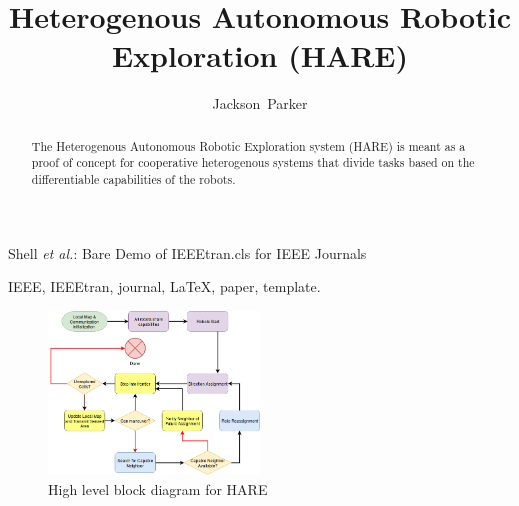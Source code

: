\documentclass[conference]{IEEEtran}
\begin{document}
\title{Heterogenous Autonomous Robotic Exploration (HARE)}

\author{Jackson~Parker}

%
{Shell \MakeLowercase{\textit{et al.}}: Bare Demo of IEEEtran.cls for IEEE Journals}











\maketitle

\begin{abstract}
  The Heterogenous Autonomous Robotic Exploration system (HARE) is meant as a proof
  of concept for cooperative heterogenous systems that divide tasks based on the
  differentiable capabilities of the robots.
\end{abstract}

\begin{IEEEkeywords}
IEEE, IEEEtran, journal, \LaTeX, paper, template.
\end{IEEEkeywords}


\IEEEpeerreviewmaketitle

\begin{figure}[H]
  \centering
    \includegraphics[width=0.5\textwidth]{HARE}
  \caption{High level block diagram for HARE}
  \label{fig:something3}
\end{figure}
\end{document}
